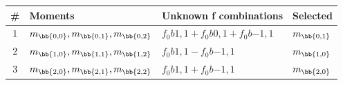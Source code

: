 \begin{table}[!h]
\centering
\begin{tabular}{c l l l}
\toprule
\# & Moments & Unknown f combinations & Selected\\
\midrule
\multirow{ 1}{*}{$1$} & \multirow{ 1}{*}{$m_\bb{0,0}, m_\bb{0,1}, m_\bb{0,2}$} & $f_0b{1,1}+f_0b{0,1}+f_0b{-1,1}$ & \multirow{ 1}{*}{$m_\bb{0,1}$}\\ 
\midrule
\multirow{ 1}{*}{$2$} & \multirow{ 1}{*}{$m_\bb{1,0}, m_\bb{1,1}, m_\bb{1,2}$} & $f_0b{1,1}-f_0b{-1,1}$ & \multirow{ 1}{*}{$m_\bb{1,0}$}\\ 
\midrule
\multirow{ 1}{*}{$3$} & \multirow{ 1}{*}{$m_\bb{2,0}, m_\bb{2,1}, m_\bb{2,2}$} & $f_0b{1,1}+f_0b{-1,1}$ & \multirow{ 1}{*}{$m_\bb{2,0}$}\\ 
\bottomrule
\end{tabular}\end{table}
